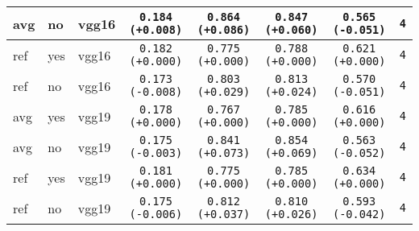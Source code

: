 \begin{tabular}{|l|l|l|c|c|c|c|c|}
avg & no & vgg16 & \texttt{0.184 {\color{green}(+0.008)}} & \texttt{0.864 {\color{red}(+0.086)}} & \texttt{0.847 {\color{red}(+0.060)}} & \texttt{0.565 {\color{red}(-0.051)}} & \texttt{4} \\
\hline
\rowcolor{verylightgray}ref & yes & vgg16 & \texttt{0.182 {\color{black}(+0.000)}} & \texttt{0.775 {\color{black}(+0.000)}} & \texttt{0.788 {\color{black}(+0.000)}} & \texttt{0.621 {\color{black}(+0.000)}} & \texttt{4} \\
ref & no & vgg16 & \texttt{0.173 {\color{red}(-0.008)}} & \texttt{0.803 {\color{red}(+0.029)}} & \texttt{0.813 {\color{red}(+0.024)}} & \texttt{0.570 {\color{red}(-0.051)}} & \texttt{4} \\
\hline
\rowcolor{verylightgray}avg & yes & vgg19 & \texttt{0.178 {\color{black}(+0.000)}} & \texttt{0.767 {\color{black}(+0.000)}} & \texttt{0.785 {\color{black}(+0.000)}} & \texttt{0.616 {\color{black}(+0.000)}} & \texttt{4} \\
avg & no & vgg19 & \texttt{0.175 {\color{red}(-0.003)}} & \texttt{0.841 {\color{red}(+0.073)}} & \texttt{0.854 {\color{red}(+0.069)}} & \texttt{0.563 {\color{red}(-0.052)}} & \texttt{4} \\
\hline
\rowcolor{verylightgray}ref & yes & vgg19 & \texttt{0.181 {\color{black}(+0.000)}} & \texttt{0.775 {\color{black}(+0.000)}} & \texttt{0.785 {\color{black}(+0.000)}} & \texttt{0.634 {\color{black}(+0.000)}} & \texttt{4} \\
ref & no & vgg19 & \texttt{0.175 {\color{red}(-0.006)}} & \texttt{0.812 {\color{red}(+0.037)}} & \texttt{0.810 {\color{red}(+0.026)}} & \texttt{0.593 {\color{red}(-0.042)}} & \texttt{4} \\
\hline
\end{tabular}
